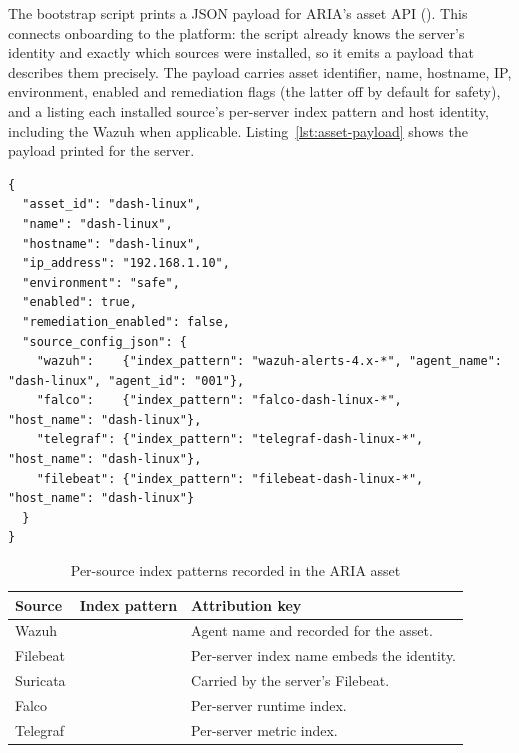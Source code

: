 The bootstrap script prints a JSON payload for ARIA's asset API (). This connects onboarding to the platform: the script already knows the server's identity and exactly which sources were installed, so it emits a payload that describes them precisely. The payload carries asset identifier, name, hostname, IP, environment, enabled and remediation flags (the latter off by default for safety), and a  listing each installed source's per-server index pattern and host identity, including the Wazuh  when applicable. Listing~\ref{lst:asset-payload} shows the payload printed for the  server.

\begin{lstlisting}[style=aria,caption={Asset Registration JSON printed by the bootstrap script (sanitized)},label={lst:asset-payload},
  emph={asset_id,name,hostname,ip_address,environment,enabled,remediation_enabled,source_config_json,wazuh,falco,telegraf,filebeat,index_pattern,agent_name,agent_id,host_name},
  emphstyle=\color{codekw}\bfseries]
{
  "asset_id": "dash-linux",
  "name": "dash-linux",
  "hostname": "dash-linux",
  "ip_address": "192.168.1.10",
  "environment": "safe",
  "enabled": true,
  "remediation_enabled": false,
  "source_config_json": {
    "wazuh":    {"index_pattern": "wazuh-alerts-4.x-*", "agent_name": "dash-linux", "agent_id": "001"},
    "falco":    {"index_pattern": "falco-dash-linux-*",    "host_name": "dash-linux"},
    "telegraf": {"index_pattern": "telegraf-dash-linux-*", "host_name": "dash-linux"},
    "filebeat": {"index_pattern": "filebeat-dash-linux-*", "host_name": "dash-linux"}
  }
}
\end{lstlisting}

\begin{table}[H]
\centering
\caption{Per-source index patterns recorded in the ARIA asset}
\begin{tabularx}{\textwidth}{@{}p{}p{}Y@{}}
\toprule
\textbf{Source} & \textbf{Index pattern} & \textbf{Attribution key} \\
\midrule
Wazuh &  & Agent name and  recorded for the asset. \\
Filebeat &  & Per-server index name embeds the identity. \\
Suricata &  & Carried by the server's Filebeat. \\
Falco &  & Per-server runtime index. \\
Telegraf &  & Per-server metric index. \\
\bottomrule
\end{tabularx}
\end{table}

